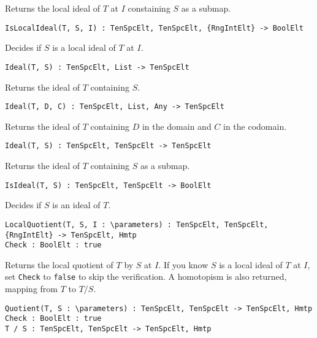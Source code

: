 Returns the local ideal of $T$ at $I$ constaining $S$ as a submap.


\color{blue}
{\small \begin{verbatim}
IsLocalIdeal(T, S, I) : TenSpcElt, TenSpcElt, {RngIntElt} -> BoolElt
\end{verbatim} }
\color{black}

Decides if $S$ is a local ideal of $T$ at $I$.

\color{blue}
{\small \begin{verbatim}
Ideal(T, S) : TenSpcElt, List -> TenSpcElt
\end{verbatim} }
\color{black}

Returns the ideal of $T$ containing $S$.

\color{blue}
{\small \begin{verbatim}
Ideal(T, D, C) : TenSpcElt, List, Any -> TenSpcElt
\end{verbatim} }
\color{black}

Returns the ideal of $T$ containing $D$ in the domain and $C$ in the codomain.

\color{blue}
{\small \begin{verbatim}
Ideal(T, S) : TenSpcElt, TenSpcElt -> TenSpcElt
\end{verbatim} }
\color{black}

Returns the ideal of $T$ containing $S$ as a submap.

\color{blue}
{\small \begin{verbatim}
IsIdeal(T, S) : TenSpcElt, TenSpcElt -> BoolElt
\end{verbatim} }
\color{black}

Decides if $S$ is an ideal of $T$.

\color{blue}
{\small \begin{verbatim}
LocalQuotient(T, S, I : \parameters) : TenSpcElt, TenSpcElt, {RngIntElt} -> TenSpcElt, Hmtp
Check : BoolElt : true
\end{verbatim} }
\color{black}

Returns the local quotient of $T$ by $S$ at $I$. If you know $S$ is a local 
ideal of $T$ at $I$, set {\tt Check} to {\tt false} to skip the verification.
A homotopism is also returned, mapping from $T$ to $T/S$.

\color{blue}
{\small \begin{verbatim}
Quotient(T, S : \parameters) : TenSpcElt, TenSpcElt -> TenSpcElt, Hmtp
Check : BoolElt : true
T / S : TenSpcElt, TenSpcElt -> TenSpcElt, Hmtp
\end{verbatim} }
\color{black}

